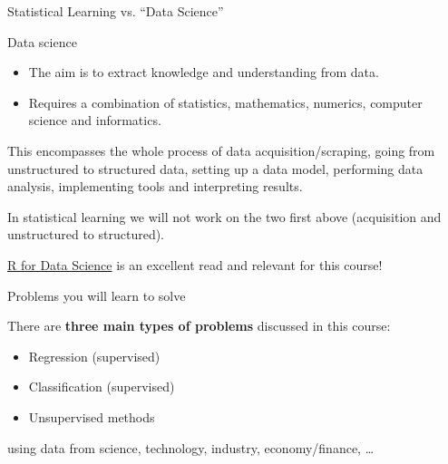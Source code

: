 \documentclass[10pt,ignorenonframetext,]{beamer}
\begin{document}
\begin{frame}{Statistical Learning vs. ``Data Science''}
\protect\hypertarget{statistical-learning-vs.-data-science}{}

Data science

\begin{itemize}
\item
  The aim is to extract knowledge and understanding from data.
  \vspace{2mm}
\item
  Requires a combination of statistics, mathematics, numerics, computer
  science and informatics.
\end{itemize}

This encompasses the whole process of data acquisition/scraping, going
from unstructured to structured data, setting up a data model,
performing data analysis, implementing tools and interpreting results.

In statistical learning we will not work on the two first above
(acquisition and unstructured to structured).

\href{http://r4ds.had.co.nz/}{R for Data Science} is an excellent read
and relevant for this course!

\end{frame}

\begin{frame}{Problems you will learn to solve}
\protect\hypertarget{problems-you-will-learn-to-solve}{}

There are \textbf{three main types of problems} discussed in this
course:

\begin{itemize}
\item
  Regression (supervised)
\item
  Classification (supervised)
\item
  Unsupervised methods
\end{itemize}

using data from science, technology, industry, economy/finance, \ldots{}

\end{frame}
\end{document}
